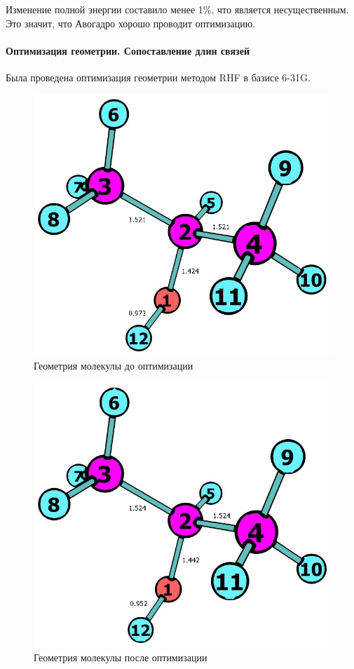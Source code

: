 Изменение полной энергии составило менее 1\%, что является несущественным. Это значит, что Авогадро хорошо проводит оптимизацию.


\paragraph*{Оптимизация геометрии. Сопоставление длин связей}
Была проведена оптимизация геометрии методом RHF в базисе 6-31G.

\begin{figure}[H]
\centering
\captionsetup{justification=centering}
\includegraphics[scale=0.4]{fig/2.jpg}
\caption{Геометрия молекулы до оптимизации}
\end{figure}

\begin{figure}[H]
\centering
\captionsetup{justification=centering}
\includegraphics[scale=0.4]{fig/3.jpg}
\caption{Геометрия молекулы после оптимизации}
\end{figure}

